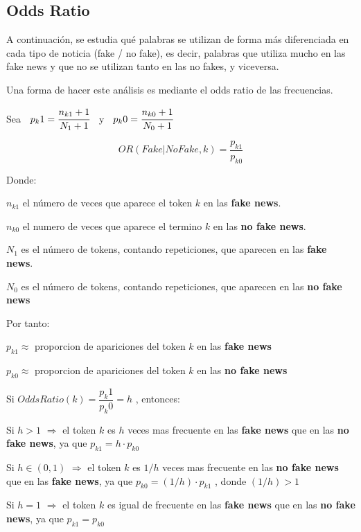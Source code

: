 \documentclass[
  11pt,
  a4paper,
]{article}
\begin{document}
\hypertarget{odds-ratio}{%
\subsection{Odds Ratio}\label{odds-ratio}}

A continuación, se estudia qué palabras se utilizan de forma más
diferenciada en cada tipo de noticia (fake / no fake), es decir,
palabras que utiliza mucho en las fake news y que no se utilizan tanto
en las no fakes, y viceversa.

Una forma de hacer este análisis es mediante el odds ratio de las
frecuencias.

Sea \(\hspace{0.2cm}p_k1 = \cfrac{n_{k1} + 1}{N_1 + 1}\hspace{0.2cm}\) y
\(\hspace{0.2cm}p_k0 = \cfrac{n_{k0} + 1}{N_0 +1}\)

\[OR(Fake|NoFake , k) = \dfrac{ p_{k1} }{ p_{k0} }\]

Donde:

\(n_{k1}\) el número de veces que aparece el token \(k\) en las
\textbf{fake news}.

\(n_{k0}\) el numero de veces que aparece el termino \(k\) en las
\textbf{no fake news}.

\(N_1\) es el número de tokens, contando repeticiones, que aparecen en
las \textbf{fake news}.

\(N_0\) es el número de tokens, contando repeticiones, que aparecen en
las \textbf{no fake news}

Por tanto:

\(p_{k1} \approx\) proporcion de apariciones del token \(k\) en las
\textbf{fake news}

\(p_{k0} \approx\) proporcion de apariciones del token \(k\) en las
\textbf{no fake news}

Si \(OddsRatio(k) = \dfrac{ p_k1 }{ p_k0 } = h\) , entonces:

Si \(h>1\) \(\Rightarrow\) el token \(k\) es \(h\) veces mas frecuente
en las \textbf{fake news} que en las \textbf{no fake news}, ya que
\(p_{k1} = h \cdot p_{k0}\)

Si \(h \in (0 , 1)\) \(\Rightarrow\) el token \(k\) es \(1/h\) veces mas
frecuente en las \textbf{no fake news} que en las \textbf{fake news}, ya
que \(p_{k0} = (1/h) \cdot p_{k1}\) , donde \((1/h)>1\)

Si \(h= 1\) \(\Rightarrow\) el token \(k\) es igual de frecuente en las
\textbf{fake news} que en las \textbf{no fake news}, ya que
\(p_{k1} = p_{k0}\)
\end{document}
